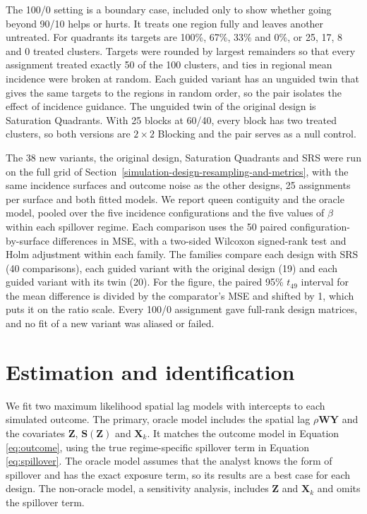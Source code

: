 \documentclass[11pt]{article}
\begin{document}
The 100/0 setting is a boundary case, included only to show whether going beyond 90/10 helps or hurts. It treats one region fully and leaves another untreated. For quadrants its targets are 100\%, 67\%, 33\% and 0\%, or 25, 17, 8 and 0 treated clusters. Targets were rounded by largest remainders so that every assignment treated exactly 50 of the 100 clusters, and ties in regional mean incidence were broken at random. Each guided variant has an unguided twin that gives the same targets to the regions in random order, so the pair isolates the effect of incidence guidance. The unguided twin of the original design is Saturation Quadrants. With 25 blocks at 60/40, every block has two treated clusters, so both versions are \(2\times2\) Blocking and the pair serves as a null control.

The 38 new variants, the original design, Saturation Quadrants and SRS were run on the full grid of Section~\ref{simulation-design-resampling-and-metrics}, with the same incidence surfaces and outcome noise as the other designs, 25 assignments per surface and both fitted models. We report queen contiguity and the oracle model, pooled over the five incidence configurations and the five values of \(\beta\) within each spillover regime. Each comparison uses the 50 paired configuration-by-surface differences in MSE, with a two-sided Wilcoxon signed-rank test and Holm adjustment within each family. The families compare each design with SRS (40 comparisons), each guided variant with the original design (19) and each guided variant with its twin (20). For the figure, the paired 95\% \(t_{49}\) interval for the mean difference is divided by the comparator's MSE and shifted by 1, which puts it on the ratio scale. Every 100/0 assignment gave full-rank design matrices, and no fit of a new variant was aliased or failed.

\FloatBarrier
\section{Estimation and identification}\label{estimation}


We fit two maximum likelihood spatial lag models with intercepts to each
simulated outcome. The primary, oracle model includes the spatial lag
\(\rho \mathbf{W}\mathbf{Y}\) and the covariates \(\mathbf{Z}\),
\(\mathbf{S}(\mathbf{Z})\) and \(\mathbf{X}_k\). It matches the outcome
model in Equation \ref{eq:outcome}, using the true regime-specific
spillover term in Equation \ref{eq:spillover}. The oracle model assumes
that the analyst knows the form of spillover and has the exact exposure
term, so its results are a best case for each design. The non-oracle
model, a sensitivity analysis, includes \(\mathbf{Z}\) and
\(\mathbf{X}_k\) and omits the spillover term.
\end{document}
